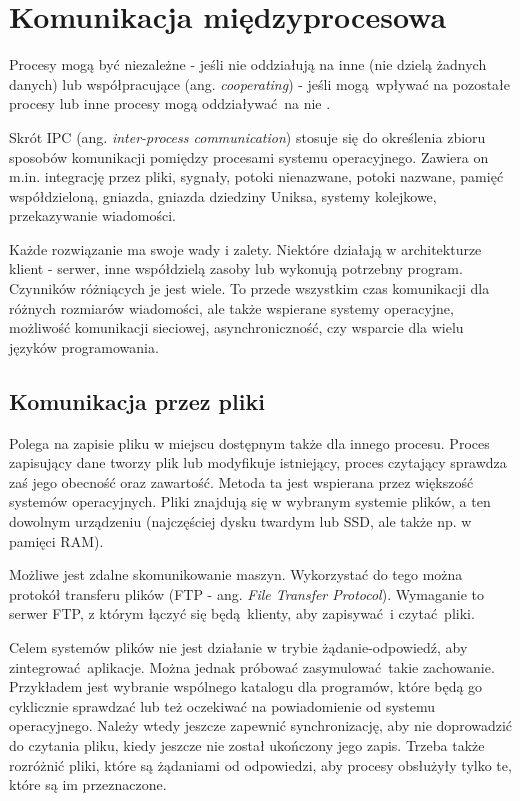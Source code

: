 \chapter{Komunikacja międzyprocesowa}

Procesy mogą być niezależne - jeśli nie oddziałują na inne (nie dzielą żadnych danych) lub współpracujące (ang. \textit{cooperating}) - jeśli mogą wpływać na pozostałe procesy lub inne procesy mogą oddziaływać na nie \cite{Silber06}.

Skrót IPC (ang. \textit{inter-process communication}) stosuje się do określenia zbioru sposobów komunikacji pomiędzy procesami systemu operacyjnego. Zawiera on m.in. integrację przez pliki, sygnały, potoki nienazwane, potoki nazwane, pamięć współdzieloną, gniazda, gniazda dziedziny Uniksa, systemy kolejkowe, przekazywanie wiadomości.

Każde rozwiązanie ma swoje wady i zalety. Niektóre działają w architekturze klient - serwer, inne współdzielą zasoby lub wykonują potrzebny program. Czynników różniących je jest wiele. To przede wszystkim czas komunikacji dla różnych rozmiarów wiadomości, ale także wspierane systemy operacyjne, możliwość komunikacji sieciowej, asynchroniczność, czy wsparcie dla wielu języków programowania.


\section{Komunikacja przez pliki}

Polega na zapisie pliku w miejscu dostępnym także dla innego procesu. Proces zapisujący dane tworzy plik lub modyfikuje istniejący, proces czytający sprawdza zaś jego obecność oraz zawartość. Metoda ta jest wspierana przez większość systemów operacyjnych. Pliki znajdują się w wybranym systemie plików, a ten dowolnym urządzeniu (najczęściej dysku twardym lub SSD, ale także np. w pamięci RAM).

Możliwe jest zdalne skomunikowanie maszyn. Wykorzystać do tego można protokół transferu plików (FTP - ang. \textit{File Transfer Protocol}). Wymaganie to serwer FTP, z którym łączyć się będą klienty, aby zapisywać i czytać pliki.

Celem systemów plików nie jest działanie w trybie żądanie-odpowiedź, aby zintegrować aplikacje. Można jednak próbować zasymulować takie zachowanie. Przykładem jest wybranie wspólnego katalogu dla programów, które będą go cyklicznie sprawdzać lub też oczekiwać na powiadomienie od systemu operacyjnego. Należy wtedy jeszcze zapewnić synchronizację, aby nie doprowadzić do czytania pliku, kiedy jeszcze nie został ukończony jego zapis. Trzeba także rozróżnić pliki, które są żądaniami od odpowiedzi, aby procesy obsłużyły tylko te, które są im przeznaczone.


